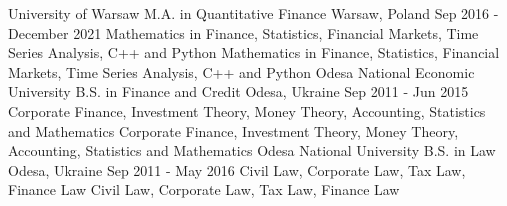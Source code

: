 
\begin{cvsection}[Education]
  \cvexperience
    {University of Warsaw}
    {M.A. in Quantitative Finance}
    {Warsaw, Poland}
    {Sep 2016 - December 2021}
    {
      Mathematics in Finance, Statistics, Financial Markets, Time Series Analysis, C++ and Python
    }
    {
      Mathematics in Finance, Statistics, Financial Markets, Time Series Analysis, C++ and Python
    }
  \cvexperience
    {Odesa National Economic University}
    {B.S. in Finance and Credit}
    {Odesa, Ukraine}
    {Sep 2011 - Jun 2015}
    {
      Corporate Finance, Investment Theory, Money Theory, Accounting, Statistics and Mathematics
    }
    {
      Corporate Finance, Investment Theory, Money Theory, Accounting, Statistics and Mathematics
    }
  \cvexperience
    {Odesa National University}
    {B.S. in Law}
    {Odesa, Ukraine}
    {Sep 2011 - May 2016}
    {
      Civil Law, Corporate Law, Tax Law, Finance Law
    }
    {
      Civil Law, Corporate Law, Tax Law, Finance Law
    }

\end{cvsection}

